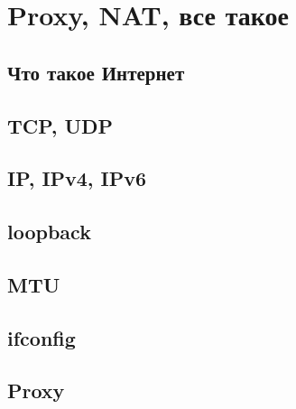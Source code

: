 \section{Proxy, NAT, все такое}
\subsection{Что такое Интернет}
\subsection{TCP, UDP}
\subsection{IP, IPv4, IPv6}
\subsection{loopback}
\subsection{MTU}
\subsection{ifconfig}
\subsection{Proxy}
\newpage